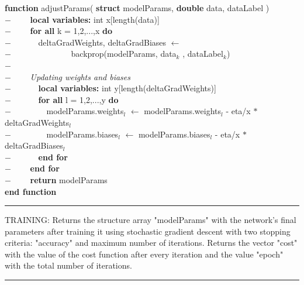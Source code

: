 \begin{addmargin}[2em]{0em}
\textbf{function} adjustParams( \textbf{struct} modelParams, \textbf{double} data, dataLabel )\\
    $- \qquad$ \textbf{local variables:} int x[length(data)]\\
    $- \qquad $ \textbf{for all} k = 1,2,...,x \textbf{do}\\
    $- \qquad \quad$ deltaGradWeights, deltaGradBiases $\leftarrow$\\
    $- \qquad \qquad \quad \qquad $ backprop(modelParams, data$_{k}$  , dataLabel$_{k}$)\\
    $- \qquad $\\
    $- \qquad $ \textit{Updating weights and biases}\\
    $- \qquad \quad$ \textbf{local variables:} int y[length(deltaGradWeights)]\\
    $- \qquad \quad $ \textbf{for all} l = 1,2,...,y \textbf{do}\\
    $- \qquad \quad \quad$ modelParams.weights$_{l}$ $\leftarrow$ modelParams.weights$_{l}$ - eta/x $*$deltaGradWeights$_{l}$\\
    $- \qquad \quad \quad$ modelParams.biases$_{l}$ $\leftarrow$ modelParams.biases$_{l}$ - eta/x $*$deltaGradBiases$_{l}$\\
    $- \qquad \quad$ \textbf{end for}\\
    $- \qquad$ \textbf{end for}\\
    $- \qquad$ \textbf{return} modelParams\\
\textbf{end function}\\
\end{addmargin}
\rule{\textwidth}{0.4pt}
 TRAINING: Returns the structure array "modelParams" with the network's final parameters after training it using stochastic gradient descent with two stopping criteria: "accuracy" and maximum number of iterations. Returns the vector "cost" with the value of the cost function after every iteration and the value "epoch" with the total number of iterations.\\
\rule{\textwidth}{0.4pt}

